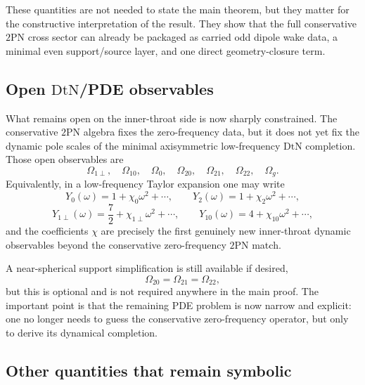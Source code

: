 \documentclass[11pt]{article}
\newcommand{\TwoPN}{\mathrm{2PN}}
\newcommand{\DtN}{\mathrm{DtN}}
\begin{document}
These quantities are not needed to state the main theorem, but they matter for the
constructive interpretation of the result.
They show that the full conservative \(\TwoPN\) cross sector can already be packaged as
carried odd dipole wake data, a minimal even support/source layer, and one direct
geometry-closure term.

\subsection{Open \texorpdfstring{$\DtN$}{DtN}/PDE observables}
\label{sec:status-open}

What remains open on the inner-throat side is now sharply constrained.
The conservative \(\TwoPN\) algebra fixes the zero-frequency data, but it does not yet
fix the dynamic pole scales of the minimal axisymmetric low-frequency \(\DtN\)
completion.
Those open observables are
\begin{equation}
\Omega_{1\perp},\quad
\Omega_{10},\quad
\Omega_0,\quad
\Omega_{20},\quad
\Omega_{21},\quad
\Omega_{22},\quad
\Omega_g.
\label{eq:status-open-poles}
\end{equation}
Equivalently, in a low-frequency Taylor expansion one may write
\begin{equation}
Y_0(\omega)=1+\chi_0\omega^2+\cdots,
\qquad
Y_2(\omega)=1+\chi_2\omega^2+\cdots,
\label{eq:status-open-chi-even}
\end{equation}
\begin{equation}
Y_{1\perp}(\omega)=\frac72+\chi_{1\perp}\omega^2+\cdots,
\qquad
Y_{10}(\omega)=4+\chi_{10}\omega^2+\cdots,
\label{eq:status-open-chi-odd}
\end{equation}
and the coefficients \(\chi\) are precisely the first genuinely new inner-throat dynamic
observables beyond the conservative zero-frequency \(\TwoPN\) match.

A near-spherical support simplification is still available if desired,
\begin{equation}
\Omega_{20}=\Omega_{21}=\Omega_{22},
\label{eq:status-open-nearspherical}
\end{equation}
but this is optional and is not required anywhere in the main proof.
The important point is that the remaining PDE problem is now narrow and explicit:
one no longer needs to guess the conservative zero-frequency operator, but only to derive
its dynamical completion.

\subsection{Other quantities that remain symbolic}
\label{sec:status-symbolic}
\end{document}
